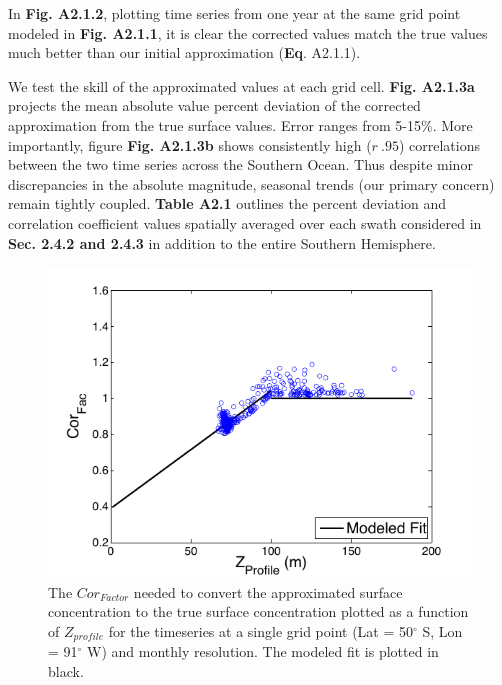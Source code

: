 In \textbf{Fig. A2.1.2}, plotting time series from one year at the same grid point modeled in \textbf{Fig. A2.1.1}, it is clear the corrected values match the true values much better than our initial approximation (\textbf{Eq}. A2.1.1).

We test the skill of the approximated values at each grid cell. \textbf{Fig. A2.1.3a} projects the mean absolute value percent deviation of the corrected approximation from the true surface values. Error ranges from 5-15\%. More importantly, figure \textbf{Fig. A2.1.3b} shows consistently high ($r\>.95$) correlations between the two time series across the Southern Ocean. Thus despite minor discrepancies in the absolute magnitude, seasonal trends (our primary concern) remain tightly coupled. \textbf{Table A2.1} outlines the percent deviation and correlation coefficient values spatially averaged over each swath considered in \textbf{Sec. 2.4.2 and 2.4.3} in addition to the entire Southern Hemisphere.







\begin{figure}[!htbp]
\begin{adjustwidth}{-1in}{-1in}
 \centering
 \includegraphics[scale=1.5]{figures/A1/Figure1.pdf}
\end{adjustwidth}
\caption[$Cor_{Factor}$ model fit]{The $Cor_{Factor}$ needed to convert the approximated surface concentration to the true surface
concentration plotted as a function of $Z_{profile}$ for the timeseries at a single grid point (Lat = 50$^\circ$ S, Lon = 91$^\circ$ W)
and monthly resolution. The modeled fit is plotted in black.}
\label{fig:Fig1}
\end{figure}



